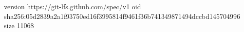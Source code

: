 version https://git-lfs.github.com/spec/v1
oid sha256:05d2839a2a1f93750ed16f3995814f9461f36b741349871494dccbd145704996
size 11068
